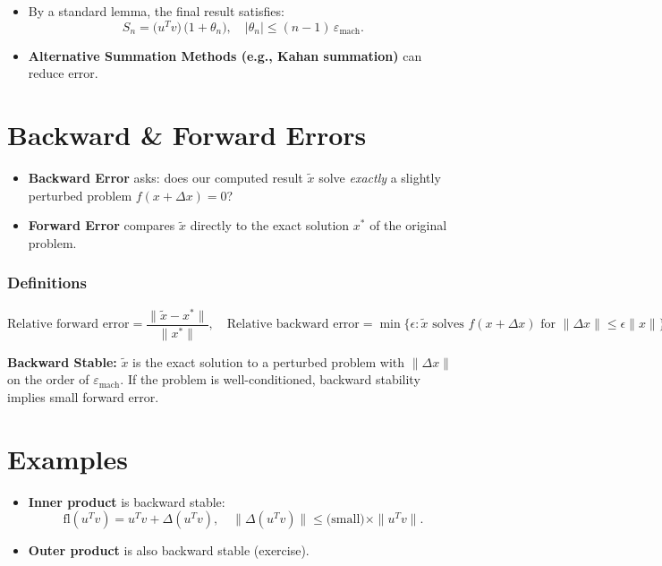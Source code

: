 \begin{itemize}
    \item By a standard lemma, the final result satisfies:
    \[
      S_n = \bigl(u^T v\bigr)\,\bigl(1 + \theta_n\bigr),
      \quad
      |\theta_n| \le (n-1)\,\varepsilon_{\mathrm{mach}}.
    \]
    \item \textbf{Alternative Summation Methods (e.g., Kahan summation)} can reduce error.
\end{itemize}

\section*{Backward \& Forward Errors}

\begin{itemize}
    \item \textbf{Backward Error} asks: does our computed result $\widetilde{x}$ solve \emph{exactly} a slightly perturbed problem $f(x + \Delta x) = 0$?
    \item \textbf{Forward Error} compares $\widetilde{x}$ directly to the exact solution $x^*$ of the original problem.
\end{itemize}

\subsubsection*{Definitions}
\[
\text{Relative forward error} = \frac{\|\widetilde{x} - x^*\|}{\|x^*\|}, 
\quad
\text{Relative backward error} 
= \min \bigl\{\epsilon : \widetilde{x} \text{ solves } f(x+\Delta x)\text{ for }\|\Delta x\|\le \epsilon \|x\|\bigr\}.
\]

\noindent
\textbf{Backward Stable:} $\widetilde{x}$ is the exact solution to a perturbed problem with $\|\Delta x\|$ on the order of $\varepsilon_{\mathrm{mach}}$. If the problem is well-conditioned, backward stability implies small forward error.

\section*{Examples}

\begin{itemize}
    \item \textbf{Inner product} is backward stable:
    \[
      \mathrm{fl}(u^T v) = u^T v + \Delta (u^T v),
      \quad
      \|\Delta (u^T v)\| \le \text{(small)} \times \|u^T v\|.
    \]
    \item \textbf{Outer product} is also backward stable (exercise).
\end{itemize}

